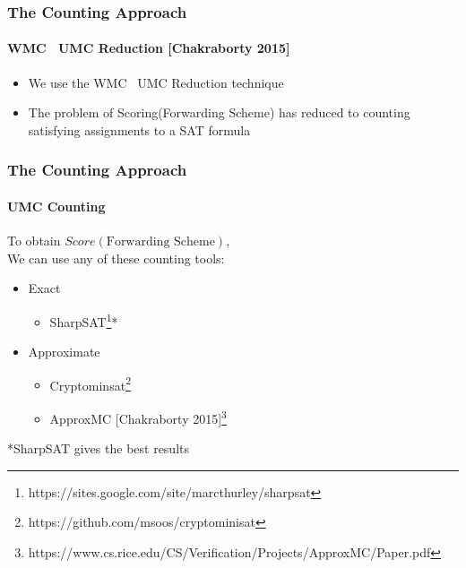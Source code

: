 \documentclass{beamer}
\begin{document}
\begin{frame}
\frametitle{The Counting Approach}
\framesubtitle{WMC \to \ UMC Reduction [Chakraborty 2015]}

	\begin{itemize}
		\item We use the WMC \to \ UMC Reduction technique
		\item The problem of Scoring(Forwarding Scheme) has reduced to counting satisfying assignments to a SAT formula 
	\end{itemize}
\end{frame}

\begin{frame}
\frametitle{The Counting Approach}
\framesubtitle{UMC Counting}
	To obtain $Score(\text{Forwarding Scheme})$,\\
	We can use any of these counting tools:
	\begin{itemize}
	\item Exact
		\begin{itemize}
		\item SharpSAT\footnote{https://sites.google.com/site/marcthurley/sharpsat}*
		\end{itemize}

	\item Approximate
		\begin{itemize}
		\item Cryptominsat\footnote{https://github.com/msoos/cryptominisat}
		\item ApproxMC [Chakraborty 2015]\footnote{https://www.cs.rice.edu/CS/Verification/Projects/ApproxMC/Paper.pdf}\\[3ex]
		\end{itemize}
	\end{itemize}
	*SharpSAT gives the best results
\end{frame}
\end{document}
